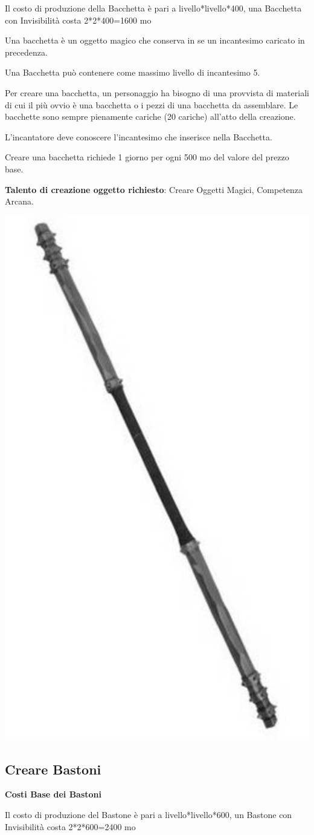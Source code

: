 \begin{multicols}{2}
Il costo di produzione della Bacchetta è pari a livello*livello*400, una Bacchetta con Invisibilità costa 2*2*400=1600 mo

Una bacchetta è un oggetto magico che conserva in se un incantesimo caricato in precedenza.

Una Bacchetta può contenere come massimo livello di incantesimo 5.

Per creare una bacchetta, un personaggio ha bisogno di una provvista di materiali di cui il più ovvio è una bacchetta o i pezzi di una bacchetta da assemblare. Le bacchette sono sempre pienamente cariche (20 cariche) all'atto della creazione.

L'incantatore deve conoscere l'incantesimo che inserisce nella Bacchetta.

Creare una bacchetta richiede 1 giorno per ogni 500 mo del valore del prezzo base.

\medskip

\textbf{Talento di creazione oggetto richiesto}: Creare Oggetti Magici, Competenza Arcana.

\begin{center}
	\includegraphics[width=0.35\linewidth]{immagini/staff2.png}
\end{center}

\subsection{Creare Bastoni}\label{crearebastoni}

\textbf{Costi Base dei Bastoni}

\bigskip

Il costo di produzione del Bastone è pari a livello*livello*600, un Bastone con Invisibilità costa 2*2*600=2400 mo


\end{multicols}
